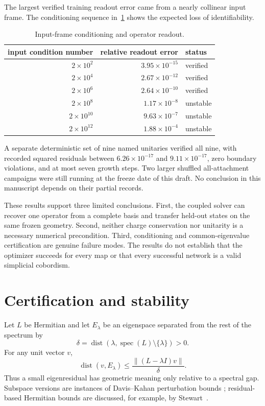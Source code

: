 \documentclass[11pt]{article}
\numberwithin{equation}{section}
\theoremstyle{definition}
\theoremstyle{remark}
\newcommand{\spec}{\operatorname{spec}}
\newcommand{\dist}{\operatorname{dist}}
\newcommand{\norm}[1]{\left\lVert #1\right\rVert}
\begin{document}
The largest verified training readout error came from a nearly collinear input
frame.  The conditioning sequence in~\cref{tab:conditioning} shows the expected
loss of identifiability.

\begin{table}[htbp]
  \centering
  \caption{Input-frame conditioning and operator readout.}
  \label{tab:conditioning}
  \begin{tabular}{rrl}
    \toprule
    input condition number & relative readout error & status\\
    \midrule
    $2\times10^2$ & $3.95\times10^{-15}$ & verified\\
    $2\times10^4$ & $2.67\times10^{-12}$ & verified\\
    $2\times10^6$ & $2.64\times10^{-10}$ & verified\\
    $2\times10^8$ & $1.17\times10^{-8}$ & unstable\\
    $2\times10^{10}$ & $9.63\times10^{-7}$ & unstable\\
    $2\times10^{12}$ & $1.88\times10^{-4}$ & unstable\\
    \bottomrule
  \end{tabular}
\end{table}

A separate deterministic set of nine named unitaries verified all nine, with
recorded squared residuals between $6.26\times10^{-17}$ and
$9.11\times10^{-17}$, zero boundary violations, and at most seven growth steps.
Two larger shuffled all-attachment campaigns were still running at the freeze
date of this draft.  No conclusion in this manuscript depends on their partial
records.

These results support three limited conclusions.  First, the coupled solver can
recover one operator from a complete basis and transfer held-out states on the
same frozen geometry.  Second, neither charge conservation nor unitarity is a
necessary numerical precondition.  Third, conditioning and common-eigenvalue
certification are genuine failure modes.  The results do not establish that the
optimizer succeeds for every map or that every successful network is a valid
simplicial cobordism.

\section{Certification and stability}

Let $L$ be Hermitian and let $E_\lambda$ be an eigenspace separated from the
rest of the spectrum by
\begin{equation}
  \delta=\dist(\lambda,\spec(L)\setminus\{\lambda\})>0.
\end{equation}
For any unit vector $v$,
\begin{equation}
  \dist(v,E_\lambda)
  \leq \frac{\norm{(L-\lambda I)v}}{\delta}.
  \label{eq:residual-gap}
\end{equation}
Thus a small eigenresidual has geometric meaning only relative to a spectral
gap.  Subspace versions are instances of Davis--Kahan perturbation bounds
\cite{davis1970}; residual-based Hermitian bounds are discussed, for example,
by Stewart~\cite{stewart1991}.
\end{document}
